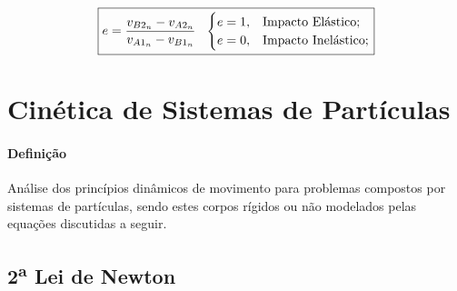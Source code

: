 \documentclass{article}
\begin{document}
\begin{enumerate}[noitemsep]
                        \begin{equation}
                            \boxed{
                                e = \frac{v_{B2_{n}} - v_{A2_{n}}}{v_{A1_{n}} - v_{B1_{n}}}
                                \hspace{2.5mm}
                                \begin{cases}
                                    e = 1, & \text{Impacto Elástico};\\
                                    e = 0, & \text{Impacto Inelástico};\\
                                \end{cases}
                            }
                        \end{equation}
                \end{enumerate}
\newpage

    \section{Cinética de Sistemas de Partículas}
        \paragraph{Definição}Análise dos princípios dinâmicos de movimento para problemas compostos por sistemas de partículas, sendo estes corpos rígidos ou não modelados pelas equações discutidas a seguir.

        \subsection{2\textsuperscript{a} Lei de Newton}
\end{document}
